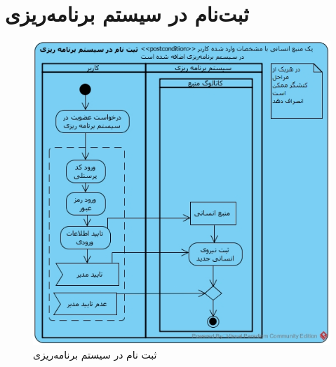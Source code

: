\section{ثبت‌نام در سیستم برنامه‌ریزی}
\begin{figure}[H]
	\centering
	\includegraphics[scale=0.8]{img/activity/SignUp}
	\caption{ثبت نام در سیستم برنامه‌ریزی}
\end{figure}

